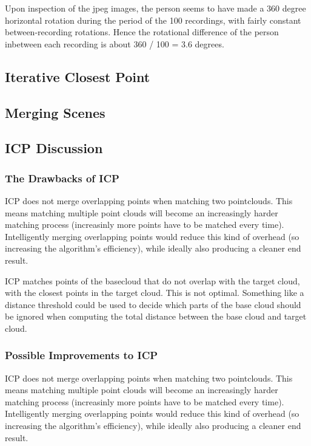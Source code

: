 \documentclass[11pt,english]{article}
\begin{document}
\noindent
Upon inspection of the jpeg images, the person seems to have made a 360 degree horizontal rotation during the period of the 100 recordings, with fairly constant between-recording rotations. Hence the rotational difference of the person inbetween each recording is about 360 / 100 = 3.6 degrees.\\


\subsection{Iterative Closest Point}


\subsection{Merging Scenes}


\subsection{ICP Discussion}

\subsubsection{The Drawbacks of ICP}
ICP does not merge overlapping points when matching two pointclouds. This means matching multiple point clouds will become an increasingly harder matching process (increasinly more points have to be matched every time). Intelligently merging overlapping points would reduce this kind of overhead (so increasing the algorithm's efficiency), while ideally also producing a cleaner end result.

ICP matches points of the basecloud that do not overlap with the target cloud, with the closest points in the target cloud. This is not optimal. Something like a distance threshold could be used to decide which parts of the base cloud should be ignored when computing the total distance between the base cloud and target cloud.


\subsubsection{Possible Improvements to ICP}
ICP does not merge overlapping points when matching two pointclouds. This means matching multiple point clouds will become an increasingly harder matching process (increasinly more points have to be matched every time). Intelligently merging overlapping points would reduce this kind of overhead (so increasing the algorithm's efficiency), while ideally also producing a cleaner end result.
\end{document}
